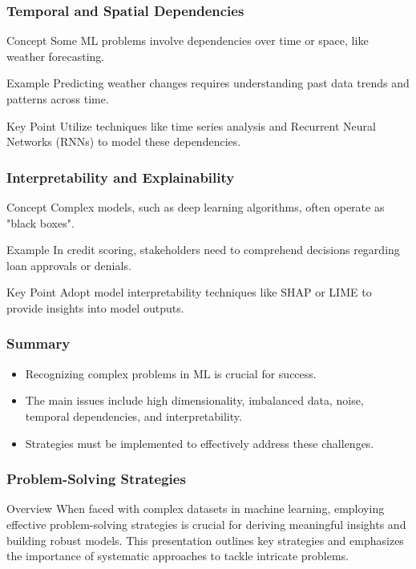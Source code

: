 \documentclass[aspectratio=169]{beamer}
\begin{document}
\begin{frame}[fragile]
    \frametitle{Temporal and Spatial Dependencies}
    \begin{block}{Concept}
        Some ML problems involve dependencies over time or space, like weather forecasting.
    \end{block}
    \begin{exampleblock}{Example}
        Predicting weather changes requires understanding past data trends and patterns across time.
    \end{exampleblock}
    \begin{block}{Key Point}
        Utilize techniques like time series analysis and Recurrent Neural Networks (RNNs) to model these dependencies.
    \end{block}
\end{frame}

\begin{frame}[fragile]
    \frametitle{Interpretability and Explainability}
    \begin{block}{Concept}
        Complex models, such as deep learning algorithms, often operate as "black boxes".
    \end{block}
    \begin{exampleblock}{Example}
        In credit scoring, stakeholders need to comprehend decisions regarding loan approvals or denials.
    \end{exampleblock}
    \begin{block}{Key Point}
        Adopt model interpretability techniques like SHAP or LIME to provide insights into model outputs.
    \end{block}
\end{frame}

\begin{frame}[fragile]
    \frametitle{Summary}
    \begin{itemize}
        \item Recognizing complex problems in ML is crucial for success.
        \item The main issues include high dimensionality, imbalanced data, noise, temporal dependencies, and interpretability.
        \item Strategies must be implemented to effectively address these challenges.
    \end{itemize}
\end{frame}

\begin{frame}[fragile]
    \frametitle{Problem-Solving Strategies}
    \begin{block}{Overview}
        When faced with complex datasets in machine learning, employing effective problem-solving strategies is crucial for deriving meaningful insights and building robust models. This presentation outlines key strategies and emphasizes the importance of systematic approaches to tackle intricate problems.
    \end{block}
\end{frame}
\end{document}
